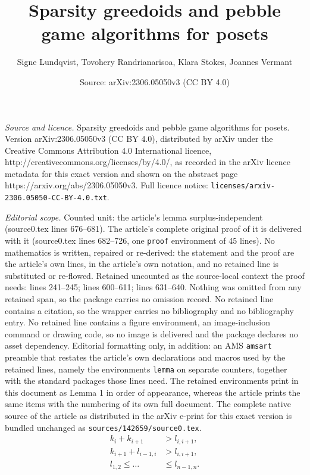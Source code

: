 \documentclass[10pt,a4paper]{amsart}
\title{Sparsity greedoids and pebble game algorithms for posets}
\author{Signe Lundqvist, Tovohery Randrianarisoa, Klara Stokes, Joannes Vermant}
\date{Source: arXiv:2306.05050v3 (CC BY 4.0)}
\begin{document}
\maketitle

\noindent\emph{Source and licence.} Sparsity greedoids and pebble game algorithms for posets. Version arXiv:2306.05050v3 (CC BY 4.0), distributed by arXiv under the Creative Commons Attribution 4.0 International licence, http://creativecommons.org/licenses/by/4.0/, as recorded in the arXiv licence metadata for this exact version and shown on the abstract page https://arxiv.org/abs/2306.05050v3. Full licence notice: \texttt{licenses/arxiv-2306.05050-CC-BY-4.0.txt}.\par\smallskip

\noindent\textit{Editorial scope.} Counted unit: the article's lemma surplus-independent (source0.tex lines 676--681). The article's complete original proof of it is delivered with it (source0.tex lines 682--726, one \texttt{proof} environment of 45 lines). No mathematics is written, repaired or re-derived: the statement and the proof are the article's own lines, in the article's own notation, and no retained line is substituted or re-flowed.  Retained uncounted as the source-local context the proof needs: lines 241--245; lines 600--611; lines 631--640.  Nothing was omitted from any retained span, so the package carries no omission record.  No retained line contains a citation, so the wrapper carries no bibliography and no bibliography entry.  No retained line contains a figure environment, an image-inclusion command or drawing code, so no image is delivered and the package declares no asset dependency.  Editorial formatting only, in addition: an AMS \texttt{amsart} preamble that restates the article's own declarations and macros used by the retained lines, namely the environments \texttt{lemma} on separate counters, together with the standard packages those lines need.  The retained environments print in this document as Lemma 1 in order of appearance, whereas the article prints the same items with the numbering of its own full document.  The complete native source of the article as distributed in the arXiv e-print for this exact version is bundled unchanged as \texttt{sources/142659/source0.tex}.
\begin{align}
    k_i + k_{i+1} &> l_{i, i+1} \label{conditionposet1 -k k l},\\
    k_{i+1} + l_{i-1, i} &> l_{i, i+1}\label{conditionposet2 - k l l},\\
     l_{1,2} \leq  \dots &\leq l_{n-1,n}. \label{conditionposet3-increasing}
\end{align}
\end{document}
